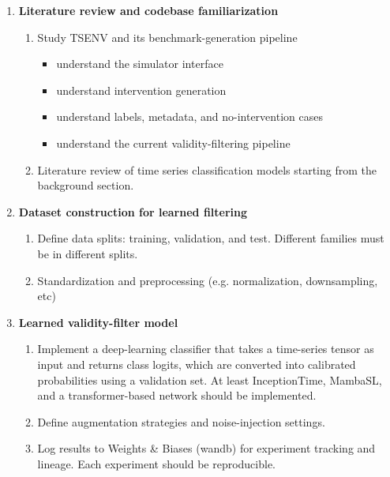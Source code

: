 \documentclass[11pt]{article}
\begin{document}
\begin{enumerate}[label=\arabic*.]
    \item \textbf{Literature review and codebase familiarization}
    \begin{enumerate}[label=\arabic{enumi}.\arabic*.]
        \item Study TSENV and its benchmark-generation pipeline
        \begin{itemize}
            \item understand the simulator interface
            \item understand intervention generation
            \item understand labels, metadata, and no-intervention cases
            \item understand the current validity-filtering pipeline
        \end{itemize}
        \item Literature review of time series classification models starting from the background section.
    \end{enumerate}

    \item \textbf{Dataset construction for learned filtering}
    \begin{enumerate}[label=\arabic{enumi}.\arabic*.]
        \item Define data splits: training, validation, and test. 
        Different families must be in different splits.
        \item Standardization and preprocessing (e.g. normalization, downsampling, etc)
    \end{enumerate}

    \item \textbf{Learned validity-filter model}
    \begin{enumerate}[label=\arabic{enumi}.\arabic*.]
        \item Implement a deep-learning classifier that takes a time-series tensor as input and returns class logits, which are converted into calibrated probabilities using a validation set.
        At least InceptionTime, MambaSL, and a transformer-based network should be implemented.
        \item Define augmentation strategies and noise-injection settings.
        \item Log results to Weights \& Biases (wandb) for experiment tracking and lineage.
        Each experiment should be reproducible.
    \end{enumerate}


\end{enumerate}
\end{document}
